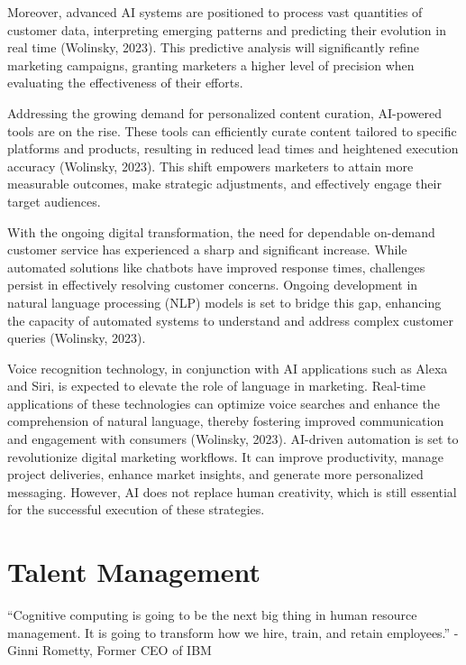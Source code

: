 \documentclass[
]{book}
\begin{document}
Moreover, advanced AI systems are positioned to process vast quantities of customer data, interpreting emerging patterns and predicting their evolution in real time (Wolinsky, 2023). This predictive analysis will significantly refine marketing campaigns, granting marketers a higher level of precision when evaluating the effectiveness of their efforts.

Addressing the growing demand for personalized content curation, AI-powered tools are on the rise. These tools can efficiently curate content tailored to specific platforms and products, resulting in reduced lead times and heightened execution accuracy (Wolinsky, 2023). This shift empowers marketers to attain more measurable outcomes, make strategic adjustments, and effectively engage their target audiences.

With the ongoing digital transformation, the need for dependable on-demand customer service has experienced a sharp and significant increase. While automated solutions like chatbots have improved response times, challenges persist in effectively resolving customer concerns. Ongoing development in natural language processing (NLP) models is set to bridge this gap, enhancing the capacity of automated systems to understand and address complex customer queries (Wolinsky, 2023).

Voice recognition technology, in conjunction with AI applications such as Alexa and Siri, is expected to elevate the role of language in marketing. Real-time applications of these technologies can optimize voice searches and enhance the comprehension of natural language, thereby fostering improved communication and engagement with consumers (Wolinsky, 2023). AI-driven automation is set to revolutionize digital marketing workflows. It can improve productivity, manage project deliveries, enhance market insights, and generate more personalized messaging. However, AI does not replace human creativity, which is still essential for the successful execution of these strategies.

\hypertarget{talent-management}{%
\section{Talent Management}\label{talent-management}}

``Cognitive computing is going to be the next big thing in human resource management. It is going to transform how we hire, train, and retain employees.''
- Ginni Rometty, Former CEO of IBM
\end{document}
